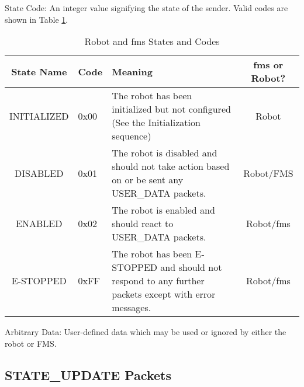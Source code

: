 \documentclass[11pt]{article}
\begin{document}
State Code: An integer value signifying the state of the sender.  Valid codes are shown in Table \ref{tab:StateCodes}.

\begin{table}[h!]
    \centering
    \caption{Robot and \acrshort{fms} States and Codes}
    \label{tab:StateCodes}
    \begin{tabular}{|c|p{1cm}|p{3in}|c|}
        \hline
        State Name & Code & Meaning & \acrshort{fms} or Robot? \\
        \hline
        INITIALIZED & 0x00 & The robot has been initialized but not configured (See the Initialization sequence) & Robot \\
        \hline
        DISABLED & 0x01 & The robot is disabled and should not take action based on or be sent any USER\_DATA packets. & Robot/FMS\\
        \hline
        ENABLED & 0x02 & The robot is enabled and should react to USER\_DATA packets. & Robot/\acrshort{fms} \\
        \hline
        E-STOPPED & 0xFF & The robot has been E-STOPPED and should not respond to any further packets except with error messages. & Robot/\acrshort{fms} \\
        \hline
    \end{tabular}
\end{table}

Arbitrary Data: User-defined data which may be used or ignored by either the robot or FMS.

\subsection {STATE\_UPDATE Packets}
\end{document}
